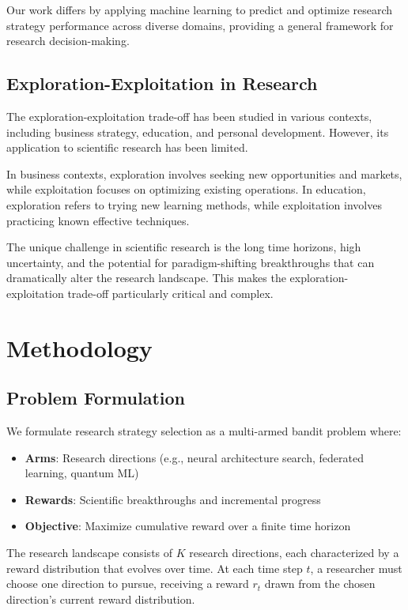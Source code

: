 \documentclass[letterpaper]{article} %
\begin{document}
Our work differs by applying machine learning to predict and optimize research strategy performance across diverse domains, providing a general framework for research decision-making.

\subsection{Exploration-Exploitation in Research}

The exploration-exploitation trade-off has been studied in various contexts, including business strategy, education, and personal development. However, its application to scientific research has been limited.

In business contexts, exploration involves seeking new opportunities and markets, while exploitation focuses on optimizing existing operations. In education, exploration refers to trying new learning methods, while exploitation involves practicing known effective techniques.

The unique challenge in scientific research is the long time horizons, high uncertainty, and the potential for paradigm-shifting breakthroughs that can dramatically alter the research landscape. This makes the exploration-exploitation trade-off particularly critical and complex.

\section{Methodology}

\subsection{Problem Formulation}

We formulate research strategy selection as a multi-armed bandit problem where:
\begin{itemize}
\item \textbf{Arms}: Research directions (e.g., neural architecture search, federated learning, quantum ML)
\item \textbf{Rewards}: Scientific breakthroughs and incremental progress
\item \textbf{Objective}: Maximize cumulative reward over a finite time horizon
\end{itemize}

The research landscape consists of $K$ research directions, each characterized by a reward distribution that evolves over time. At each time step $t$, a researcher must choose one direction to pursue, receiving a reward $r_t$ drawn from the chosen direction's current reward distribution.
\end{document}
